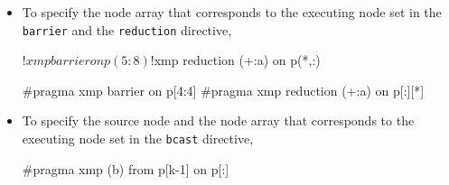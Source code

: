 \begin{itemize}
\item To specify the node array that corresponds to the executing node set
      in the {\tt barrier} and the {\tt reduction} directive,\\


\begin{minipage}{0.43\hsize}
\begin{center}
\begin{XFexample}
!$xmp barrier on p(5:8)
!$xmp reduction (+:a) on p(*,:)
\end{XFexample}
\end{center}
\end{minipage}
%
\begin{minipage}{0.54\hsize}
\begin{center}
\begin{XCexampleR}
#pragma xmp barrier on p[4:4]
#pragma xmp reduction (+:a) on p[:][*]
\end{XCexampleR}
\end{center}
\end{minipage}

\item To specify the source node and the node array that corresponds to
      the executing node set in the {\tt bcast} directive,\\


\begin{minipage}{0.43\hsize}
\begin{center}
\end{center}
\end{minipage}
%
\begin{minipage}{0.54\hsize}
\begin{center}
\begin{XCexampleR}
#pragma xmp (b) from p[k-1] on p[:]
\end{XCexampleR}
\end{center}
\end{minipage}

\end{itemize}

